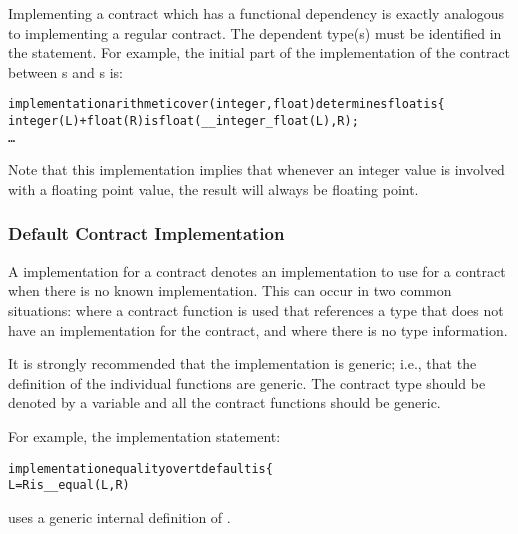 Implementing a contract which has a functional dependency is exactly analogous to implementing a regular contract. The dependent type(s) must be identified in the  statement. For example, the initial part of the implementation of the  contract between s and s is:
\begin{alltt}
implementation arithmetic over (integer,float) determines float is \{
  integer(L) + float(R) is float(\_\_integer_float(L),R);
  \ldots
\end{alltt}
Note that this implementation implies that whenever an integer value is involved with a floating point value, the result will always be floating point.

\subsubsection{Default Contract Implementation}
\label{defaultImplementation}

A  implementation for a contract denotes an implementation to use for a contract when there is no known implementation. This can occur in two common situations: where a contract function is used that references a type that does not have an implementation for the contract, and where there is no type information.

\begin{aside}
It is strongly recommended that the  implementation is generic; i.e., that the definition of the individual functions are generic. The contract type should be denoted by a variable and all the contract functions should be generic.

For example, the implementation statement:
\begin{alltt}
implementation equality over \pcent{}t default is \{
  L=R is \_\_equal(L,R)
\end{alltt}
uses a generic internal definition of .
\end{aside}

